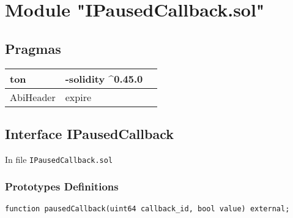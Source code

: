 
\section{Module "IPausedCallback.sol"}


\subsection{Pragmas}


\noindent\begin{tabular}{|l|l|p{5cm}|}\hline
ton & -solidity \^{}0.45.0 &\\\hline
AbiHeader &  expire &\\\hline
\end{tabular}


\subsection{Interface IPausedCallback}


In file {\tt IPausedCallback.sol}

\subsubsection{Prototypes Definitions}

\vspace{2cm}

\begin{lstlisting}[firstnumber=5]
    function pausedCallback(uint64 callback_id, bool value) external;
\end{lstlisting}
